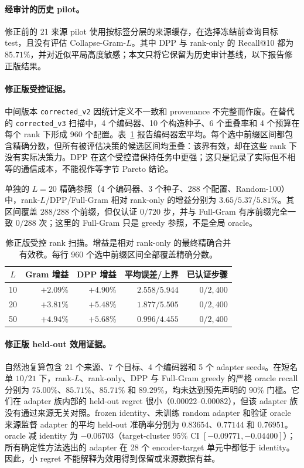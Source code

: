 \documentclass{article}
\begin{document}
\paragraph{经审计的历史 pilot。}
修正前的 21 来源 pilot 使用按标签分层的来源缓存，在选择冻结前查询目标 test，且没有评估 Collapse-Gram-$L$。其中 DPP 与 rank-only 的 Recall@10 都为 $85.71\%$，并对近似平局高度敏感；本文只将它保留为历史审计基线，以下报告修正版结果。

\paragraph{修正版受控证据。}
中间版本 \texttt{corrected\_v2} 因统计定义不一致和 provenance 不完整而作废。在替代的 \texttt{corrected\_v3} 扫描中，4 个编码器、10 个构造种子、6 个重叠率和 4 个预算在每个 rank 下形成 960 个配置。表~\ref{tab:v3_rank_sweep} 报告编码器宏平均。每个选中前缀区间都包含精确分数，但所有被评估决策的候选区间均重叠：该界有效，却在这些 rank 下没有实际决策力。DPP 在这个受控谱保持任务中更强；这只是记录了实际但不相等的通信成本，不能视作等字节 Pareto 结论。

单独的 $L=20$ 精确参照（4 个编码器、3 个种子、288 个配置、Random-100）中，rank-$L$/DPP/Full-Gram 相对 rank-only 的增益分别为 $3.65/5.37/5.81\%$。其区间覆盖 $288/288$ 个前缀，但仅认证 $0/720$ 步，并与 Full-Gram 有序前缀完全一致 $0/288$ 次；这里的 Full-Gram 只是 greedy 参照，不是全局 oracle。

\begin{table}[t]
\centering
\caption{修正版受控 rank 扫描。增益是相对 rank-only 的最终精确合并有效秩。每行 960 个选中前缀区间全部覆盖精确分数。}
\label{tab:v3_rank_sweep}
\small
\setlength{\tabcolsep}{3.2pt}
\begin{tabular}{crrrr}
\toprule
$L$ & Gram 增益 & DPP 增益 & 平均误差/上界 & 已认证步骤 \\
\midrule
10 & $+2.09\%$ & $+4.90\%$ & $2.558/5.944$ & $0/2{,}400$ \\
20 & $+3.81\%$ & $+5.48\%$ & $1.877/5.505$ & $0/2{,}400$ \\
50 & $+4.94\%$ & $+5.68\%$ & $0.996/4.455$ & $0/2{,}400$ \\
\bottomrule
\end{tabular}\normalsize
\end{table}

\paragraph{修正版 held-out 效用证据。}
自然池复算包含 21 个来源、7 个目标、4 个编码器和 5 个 adapter seeds。在短名单 $10/21$ 下，rank-$L$、rank-only、DPP 与 Full-Gram greedy 的严格 oracle recall 分别为 $75.00\%$、$85.71\%$、$85.71\%$ 和 $89.29\%$，均未达到预先声明的 $90\%$ 门槛。它们在 adapter 族内部的 held-out regret 很小（$0.00022$--$0.00082$），但该 adapter 族没有通过来源无关对照。frozen identity、未训练 random adapter 和验证 oracle 来源监督 adapter 的平均 held-out 准确率分别为 $0.83654$、$0.77144$ 和 $0.76951$。oracle 减 identity 为 $-0.06703$（target-cluster 95\% CI $[-0.09771,-0.04400]$）；所有确定性方法选出的 adapter 在 28 个 encoder-target 单元中都低于 identity。因此，小 regret 不能解释为效用得到保留或来源数据有益。
\end{document}
